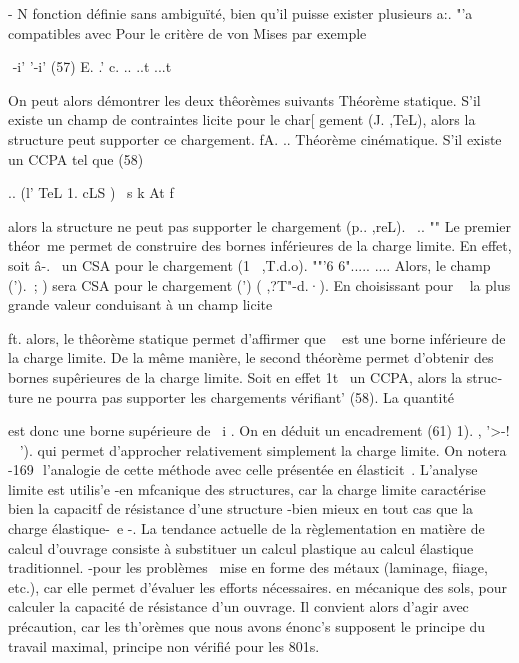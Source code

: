 -
N
fonction définie sans ambiguïté, bien qu'il puisse exister plusieurs a:. 
"'a
compatibles avec Pour le critère de von Mises par exemple 

 -i' '-i'
(57) 
E. .' c. .. 
..t ...t 

On peut alors démontrer les deux thêorèmes suivants 
Théorème statique. S'il existe un champ de contraintes licite pour le char­[ gement (J. ,TeL), alors la structure peut supporter ce chargement.
fA. .. 
Théorème cinématique. S'il existe un CCPA tel que 
(58) 

.. (l' TeL 1. cLS )
~s k At 
f 

alors la structure ne peut pas supporter le chargement (p.. ,reL). 
~.. "" 
Le premier théor~me permet de construire des bornes inférieures de la charge limite. En effet, soit â-.~ un CSA pour le chargement (1~ ,T.d.o).
""'6 6"..... .... 
Alors, le champ (').~; ) sera CSA pour le chargement (') ( ,?T"-d.·). En choisissant pour ~ la plus grande valeur conduisant à un champ licite 

ft. 
alors, le thêorème statique permet d'affirmer que ~ est une borne inférieu­re de la charge limite. 
De la même manière, le second théorème permet d'obtenir des bornes supêrieures de la charge limite. Soit en effet 1t~ un CCPA, alors la struc­ture ne pourra pas supporter les chargements vérifiant' (58). La quantité 

est donc une borne supérieure de ~i . On en déduit un encadrement 
(61) 1). , '>-! ~ '). 
qui permet d'approcher relativement simplement la charge limite. On notera 
-169 ­
l'analogie de cette méthode avec celle présentée en élasticit~. 
L'analyse limite est utilis'e 
-en mfcanique des structures, car la charge limite caractérise bien la capacitf de résistance d'une structure -bien mieux en tout cas que la charge élastique-~e -. La tendance actuelle de la règlementation en matiè­re de calcul d'ouvrage consiste à substituer un calcul plastique au calcul élastique traditionnel. 
-pour les problèmes ~mise en forme des métaux (laminage, fiiage, etc.), car elle permet d'évaluer les efforts nécessaires. 
en mécanique des sols, pour calculer la capacité de résistance d'un ouvrage. Il convient alors d'agir avec précaution, car les th'orèmes que nous avons énonc's supposent le principe du travail maximal, principe non vérifié pour les 801s. 
